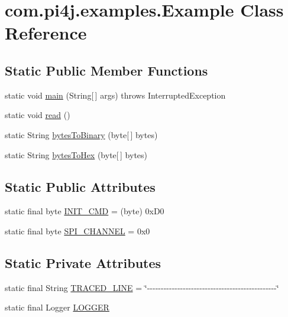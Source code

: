 \hypertarget{classcom_1_1pi4j_1_1examples_1_1Example}{}\section{com.\+pi4j.\+examples.\+Example Class Reference}
\label{classcom_1_1pi4j_1_1examples_1_1Example}
\subsection*{Static Public Member Functions}
\begin{DoxyCompactItemize}
\item 
static void \hyperlink{classcom_1_1pi4j_1_1examples_1_1Example_ab706c9d868d8965a7b8b88abb6db15fa}{main} (String\mbox{[}$\,$\mbox{]} args)  throws Interrupted\+Exception 
\item 
static void \hyperlink{classcom_1_1pi4j_1_1examples_1_1Example_ab14dd3a0a5a91192e576cecf0aa9ad5c}{read} ()
\item 
static String \hyperlink{classcom_1_1pi4j_1_1examples_1_1Example_a55c7417721387ecdaf6c27c413cb395e}{bytes\+To\+Binary} (byte\mbox{[}$\,$\mbox{]} bytes)
\item 
static String \hyperlink{classcom_1_1pi4j_1_1examples_1_1Example_ae71c0b716fdae032b20b52666a6668ce}{bytes\+To\+Hex} (byte\mbox{[}$\,$\mbox{]} bytes)
\end{DoxyCompactItemize}
\subsection*{Static Public Attributes}
\begin{DoxyCompactItemize}
\item 
static final byte \hyperlink{classcom_1_1pi4j_1_1examples_1_1Example_a9fe242ff65eed0f1f399b8e9a0e50ccd}{I\+N\+I\+T\+\_\+\+C\+M\+D} = (byte) 0x\+D0
\item 
static final byte \hyperlink{classcom_1_1pi4j_1_1examples_1_1Example_a467713cca966503adb0e98f963ca894e}{S\+P\+I\+\_\+\+C\+H\+A\+N\+N\+E\+L} = 0x0
\end{DoxyCompactItemize}
\subsection*{Static Private Attributes}
\begin{DoxyCompactItemize}
\item 
static final String \hyperlink{classcom_1_1pi4j_1_1examples_1_1Example_aebff74f082fb0684ef3c7cd361ea0480}{T\+R\+A\+C\+E\+D\+\_\+\+L\+I\+N\+E} = \char`\"{}-\/-\/-\/-\/-\/-\/-\/-\/-\/-\/-\/-\/-\/-\/-\/-\/-\/-\/-\/-\/-\/-\/-\/-\/-\/-\/-\/-\/-\/-\/-\/-\/-\/-\/-\/-\/-\/-\/-\/-\/-\/-\/-\/-\/-\/-\/-\/\char`\"{}
\item 
static final Logger \hyperlink{classcom_1_1pi4j_1_1examples_1_1Example_ae8e218a8535d844b1b928cfc835a30ba}{L\+O\+G\+G\+E\+R}
\end{DoxyCompactItemize}


